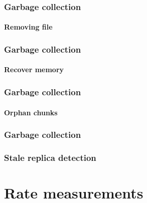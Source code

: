 \documentclass{beamer}
\begin{document}
\begin{frame}
 \frametitle{Garbage collection}
 \framesubtitle{Removing file}
\end{frame}

\begin{frame}
 \frametitle{Garbage collection}
 \framesubtitle{Recover memory}
\end{frame}

\begin{frame}
 \frametitle{Garbage collection}
 \framesubtitle{Orphan chunks}
\end{frame}

\begin{frame}
 \frametitle{Garbage collection}
 \frametitle{Stale replica detection}
 
\end{frame}

\section{Rate measurements}
\end{document}
